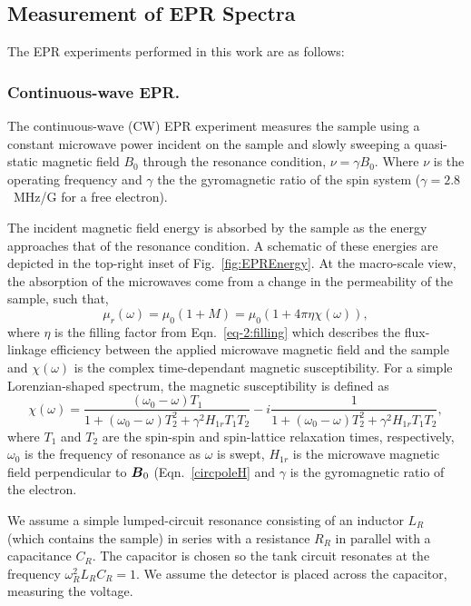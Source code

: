 \newpage
\subsection{Measurement of EPR Spectra}
The EPR experiments performed in this work are as follows:

\subsubsection*{Continuous-wave EPR.}
The continuous-wave (CW) EPR experiment measures the sample using a constant microwave power incident on the sample and slowly sweeping a quasi-static magnetic field $B_0$ through the resonance condition, $\nu =\gamma B_0$. Where $\nu$ is the operating frequency and $\gamma$ the the gyromagnetic ratio of the spin system ($\gamma = 2.8$~MHz/G for a free electron).  

The incident magnetic field energy is absorbed by the sample as the energy approaches that of the resonance condition. A schematic of these energies are depicted in the top-right inset of Fig.~\ref{fig:EPREnergy}. At the macro-scale view, the absorption of the microwaves come from a change in the permeability of the sample, such that, 
\begin{equation}
    \mu_r(\omega) = \mu_0 (1+M) = \mu_0 (1+ 4 \pi \eta \chi(\omega)), \label{eq-2:permea}
\end{equation} 
where $\eta$ is the filling factor from Eqn.~\ref{eq-2:filling} which describes the flux-linkage efficiency between the applied microwave magnetic field and the sample and $\chi(\omega)$ is the complex time-dependant magnetic susceptibility. For a simple Lorenzian-shaped spectrum, the magnetic susceptibility is defined as 
\begin{equation}
      \chi(\omega) = \frac{(\omega_0 - \omega) T_1 }{1+(\omega_0 - \omega)T_2^2+\gamma^2 H_{1r} T_1 T_2}- i \frac{1}{1+(\omega_0 - \omega)T_2^2+\gamma^2 H_{1r} T_1 T_2}, \label{eq-2:chi}
\end{equation}
where $T_1$ and $T_2$ are the spin-spin and spin-lattice relaxation times, respectively, $\omega_0$ is the frequency of resonance as $\omega$ is swept, $H_{1r}$ is the microwave magnetic field perpendicular to $\boldsymbol{B}_{0}$ (Eqn.~\ref{circpoleH} and $\gamma$ is the gyromagnetic ratio of the electron. \cite{abragam1961}

We assume a simple lumped-circuit resonance consisting of an inductor $L_R$ (which contains the sample) in series with a resistance $R_R$ in parallel with a capacitance $C_R$. The capacitor is chosen so the tank circuit resonates at the frequency $\omega_R^2 L_R C_R = 1$. We assume the detector is placed across the capacitor, measuring the voltage. 

